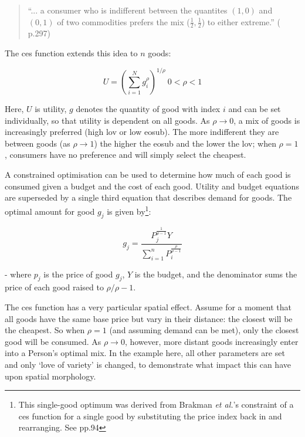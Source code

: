 \begin{quote}
``... a consumer who is indifferent between the quantites $(1,0)$ and $(0,1)$ of two commodities prefers the mix ($\frac{1}{2},\frac{1}{2}$) to either extreme.'' (\citealt{dixit_monopolistic_1977} p.297)
\end{quote}

The \gls{ces} function extends this idea to $n$ goods:
 
\begin{equation}
U=\left(\sum_{i=1}^{N}g_{i}^{\rho}\right)^{1/\rho}\ 0 < \rho < 1 \label{eq:-6}
\end{equation}

Here, $U$ is utility, $g$ denotes the quantity of good with index $i$ and can be set individually, so that utility is dependent on all goods. As $\rho \rightarrow 0$, a mix of goods is increasingly preferred (high \gls{lov} or low \gls{eosub}). The more indifferent they are between goods (as $\rho \rightarrow 1$) the higher the \gls{eosub} and the lower the \gls{lov}; when $\rho = 1$,  consumers have no preference and will simply select the cheapest. 

A constrained optimisation can be used to determine how much of each good is consumed given a budget and the cost of each good. Utility and budget equations are superseded by a single third equation that describes demand for goods. The optimal amount for good $g_j$ is given by\footnote{This single-good optimum was derived from Brakman \emph{et al.}'s constraint of a \gls{ces} function for a single good by substituting the price index back in and rearranging. See \citealt{brakman_new_2009} pp.94}:

\begin{equation}
g_j = \frac{P_j^\frac{1}{\rho-1}Y}{\sum_{i=1}^{n}P_i^\frac{\rho}{\rho-1}} \label{eq:CESconstrained}
\end{equation}

- where $p_j$ is the price of good $g_j$, $Y$ is the budget, and the denominator sums the price of each good raised to $\rho/\rho-1$.

The \gls{ces} function has a very particular spatial effect. Assume for a moment that all goods have the same base price but vary in their distance: the closest will be the cheapest. So when $\rho = 1$ (and assuming demand can be met), only the closest good will be consumed. As $\rho \rightarrow 0$, however, more distant goods increasingly enter into a Person's optimal mix. In the example here, all other parameters are set and only `love of variety' is changed, to demonstrate what impact this can have upon spatial morphology. 

